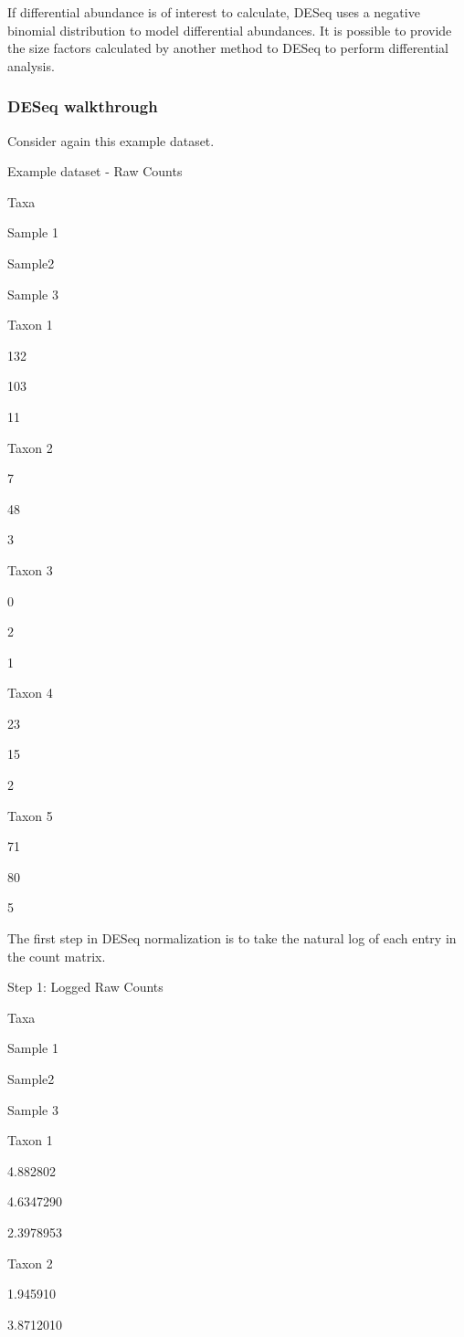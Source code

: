 \documentclass[
]{book}
\begin{document}
If differential abundance is of interest to calculate, DESeq uses a negative binomial distribution to model differential abundances. It is possible to provide the size factors calculated by another method to DESeq to perform differential analysis.

\hypertarget{deseq-walkthrough}{%
\subsubsection{DESeq walkthrough}\label{deseq-walkthrough}}

Consider again this example dataset.

\label{tab:unnamed-chunk-20}Example dataset - Raw Counts

Taxa

Sample 1

Sample2

Sample 3

Taxon 1

132

103

11

Taxon 2

7

48

3

Taxon 3

0

2

1

Taxon 4

23

15

2

Taxon 5

71

80

5

The first step in DESeq normalization is to take the natural log of each entry in the count matrix.

\label{tab:unnamed-chunk-21}Step 1: Logged Raw Counts

Taxa

Sample 1

Sample2

Sample 3

Taxon 1

4.882802

4.6347290

2.3978953

Taxon 2

1.945910

3.8712010
\end{document}
